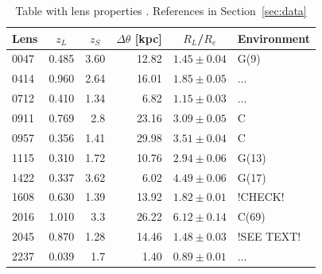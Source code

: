 \documentclass[useAMS,usenatbib]{mn2e}
\begin{document}
\begin{table}
  \begin{center}
    \begin{tabular}{l r r r r l}
      Lens    & \multicolumn{1}{c}{$z_{L}$} & \multicolumn{1}{c}{$z_{S}$} & \multicolumn{1}{c}{$\Delta\theta$ [kpc]} & \multicolumn{1}{c}{$R_{L}$/$R_{e}$} & Environment \\ \hline
      0047 & 0.485 & 3.60 & 12.82 & $1.45\pm0.04$ & G(9) \\
      0414 & 0.960 & 2.64 & 16.01 & $1.85\pm0.05$ & ... \\
      0712 & 0.410 & 1.34 & 6.82  & $1.15\pm0.03$ & ... \\
      0911 & 0.769 & 2.8  & 23.16 & $3.09\pm0.05$ & C \\
      0957 & 0.356 & 1.41 & 29.98 & $3.51\pm0.04$ & C \\
      1115 & 0.310 & 1.72 & 10.76 & $2.94\pm0.06$ & G(13) \\
      1422 & 0.337 & 3.62 & 6.02  & $4.49\pm0.06$ & G(17) \\
      1608 & 0.630 & 1.39 & 13.92 & $1.82\pm0.01$ & !CHECK! \\
      2016 & 1.010 & 3.3  & 26.22 & $6.12\pm0.14$ & C(69) \\
      2045 & 0.870 & 1.28 & 14.46 & $1.48\pm0.03$ & !SEE TEXT! \\
      2237 & 0.039 & 1.7  & 1.40  & $0.89\pm0.01$ & ... \\
    \end{tabular}
    \caption[width=\linewidth]{Table with lens properties \citep[see][]{2011ApJ...740...97L}. References in Section~\ref{sec:data} }
    \label{tab:lensproperties}
  \end{center}
\end{table}
\end{document}
